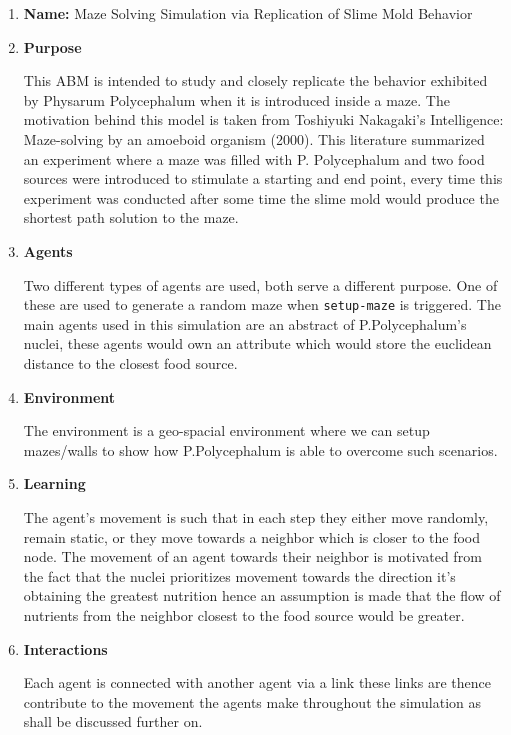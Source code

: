 \documentclass[a4paper, 11pt]{article}
\begin{document}
\begin{enumerate}
    \item \textbf{Name: } Maze Solving Simulation via Replication of Slime Mold Behavior
    \item \textbf{Purpose}\par 
    This ABM is intended to study and closely replicate the behavior exhibited by Physarum Polycephalum when it is introduced inside a maze. The motivation behind this model is taken from Toshiyuki Nakagaki's Intelligence: Maze-solving by an amoeboid organism (2000). This literature summarized an experiment where a maze was filled with P. Polycephalum and two food sources were introduced to stimulate a starting and end point, every time this experiment was conducted after some time the slime mold would produce the shortest path solution to the maze.  
    
    \item \textbf{Agents}\par
    Two different types of agents are used, both serve a different purpose. One of these are used to generate a random maze when \texttt{setup-maze} is triggered. The main agents used in this simulation are an abstract of P.Polycephalum’s nuclei, these agents would own an attribute which would store the euclidean distance to the closest food source.
    
    \item \textbf{Environment}\par
    The environment is a geo-spacial environment where we can setup mazes/walls to show how P.Polycephalum is able to overcome such scenarios.
    
    \item \textbf{Learning}\par
    The agent's movement is such that in each step they either move randomly, remain static, or they move towards a neighbor which is closer to the food node. The movement of an agent towards their neighbor is motivated from the fact that the nuclei prioritizes movement towards the direction it's obtaining the greatest nutrition hence an assumption is made that the flow of nutrients from the neighbor closest to the food source would be greater.
    
    \item \textbf{Interactions}\par
    Each agent is connected with another agent via a link these links are thence contribute to the movement the agents make throughout the simulation as shall be discussed further on.
    

\end{enumerate}
\end{document}
